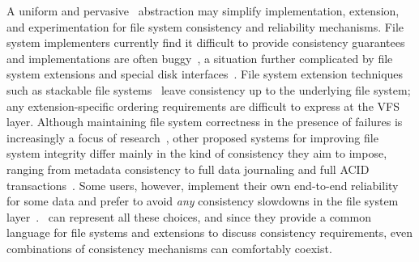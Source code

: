 A uniform and pervasive \patch\ abstraction may simplify
 implementation, extension, and experimentation for
 file system consistency and reliability mechanisms.
%
File system implementers currently find it difficult to provide
 consistency guarantees~\cite{tweedie98journaling,mckusick99soft}
 and implementations are often buggy~\cite{yang04using,yang06explode},
 a situation further complicated by file system extensions and
 special disk interfaces~\cite{soules03metadata,fast04versionfs,quinlan02venti,cornell04wayback,wright03ncryptfs,sivathanu03semantically-smart,sivathanu05database-aware}.
%
File system extension techniques such as stackable file
 systems~\cite{zadok00fist,zadok99extending,heidemann94filesystem,rosenthal90evolving}
 leave consistency up to the underlying file system; any extension-specific
 ordering requirements are difficult to express at the VFS layer.
%
Although maintaining file system
 correctness in the presence of failures is increasingly a focus of
 research~\cite{sivathanuetal05-logic,denehyetal05-journal-guided},
%
other proposed systems for improving file system integrity
 differ mainly in the kind of consistency they aim to impose, ranging from
 metadata consistency to full data journaling and full ACID
 transactions~\cite{gal05transactional,liskov04transactional}.
%
Some users, however, implement their own end-to-end reliability for some data
 and prefer to avoid \emph{any} consistency
 slowdowns in the file system layer~\cite{googleext2}.
%
\Patches\ can represent all these choices, and since they provide a common
 language for file systems and extensions to discuss consistency
 requirements, even combinations of consistency mechanisms can
 comfortably coexist.


\begin{comment}
But different extensions within a file system, or different
 applications over the file system, may require different types of
 consistency semantics, and performance suffers when lower layers are
 unnecessarily denied the opportunity to reorder writes;
\Patches\ can implement many consistency mechanisms, including
 soft updates and journaling, and can allow combinations of different
 consistency protocols to exist at the same time.
\Patches\ provide a simple and effective way for such extensions to
 express their requirements of the storage system, adding to the
 requirements already expressed by the file system itself.
\end{comment}


